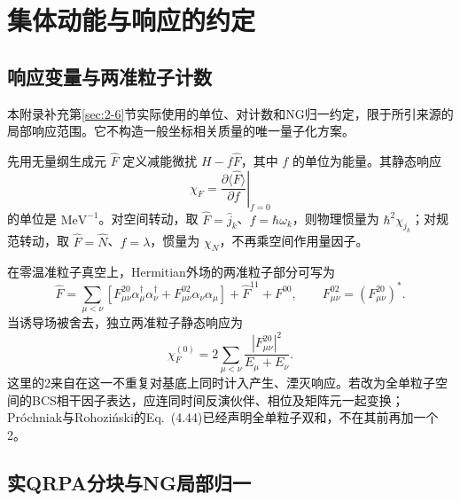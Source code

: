 \chapter{集体动能与响应的约定}\label{app:C}

\section{响应变量与两准粒子计数}\label{app:C-response-counting}

本附录补充第\ref{sec:2-6}节实际使用的单位、对计数和NG归一约定，限于所引来源的局部响应范围。它不构造一般坐标相关质量的唯一量子化方案。

先用无量纲生成元 \(\hat F\) 定义减能微扰 \(H-f\hat F\)，其中 \(f\) 的单位为能量。其静态响应
\begin{equation}\label{eq:app-c-static-susceptibility}
\chi_F=\left.
\frac{\partial\langle\hat F\rangle}{\partial f}
\right|_{f=0}
\end{equation}
的单位是 \(\mathrm{MeV}^{-1}\)。对空间转动，取 \(\hat F=\hat j_k\)、\(f=\hbar\omega_k\)，则物理惯量为 \(\hbar^2\chi_{j_k}\)；对规范转动，取 \(\hat F=\hat N\)、\(f=\lambda\)，惯量为 \(\chi_N\)，不再乘空间作用量因子。

在零温准粒子真空上，Hermitian外场的两准粒子部分可写为
\begin{equation}\label{eq:app-c-field-components}
\hat F=\sum_{\mu<\nu}\left[
F^{20}_{\mu\nu}\alpha_\mu^\dagger\alpha_\nu^\dagger
+F^{02}_{\mu\nu}\alpha_\nu\alpha_\mu
\right]+\hat F^{11}+F^{00},
\qquad F^{02}_{\mu\nu}=(F^{20}_{\mu\nu})^* .
\end{equation}
当诱导场被舍去，独立两准粒子静态响应为
\begin{equation}\label{eq:app-c-independent-response}
\chi_F^{(0)}
=2\sum_{\mu<\nu}
\frac{|F^{20}_{\mu\nu}|^2}{E_\mu+E_\nu}.
\end{equation}
这里的2来自在这一不重复对基底上同时计入产生、湮灭响应。若改为全单粒子空间的BCS相干因子表达，应连同时间反演伙伴、相位及矩阵元一起变换；Próchniak与Rohoziński的Eq.~(4.44)已经声明全单粒子双和，不在其前再加一个2。\cite[Eq.~(4.44)]{prochniak-rohozinski-2009-bohr-collective-hamiltonian}\cite[APS~PDF~pp.~3--4, Eqs.~(25), (32)--(34)]{hinohara-2015-nambu-goldstone-inertia-response}

\section{实QRPA分块与NG局部归一}\label{app:C-ng-normalization}

